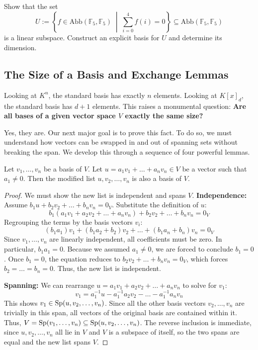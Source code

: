 \begin{exercise}
\label{exc:basis_f5_functions_subspace}
Show that the set
\[
U := \left\{ f \in \mathrm{Abb}(\mathbb{F}_5, \mathbb{F}_5) \;\middle|\; \sum_{i=0}^4 f(i) = 0 \right\} \subseteq \mathrm{Abb}(\mathbb{F}_5, \mathbb{F}_5)
\]
is a linear subspace. Construct an explicit basis for $U$ and determine its dimension.
\end{exercise}

\subsection{The Size of a Basis and Exchange Lemmas}

Looking at $K^n$, the standard basis has exactly $n$ elements. Looking at $K[x]_d$, the standard basis has $d+1$ elements. This raises a monumental question:
\textbf{Are all bases of a given vector space $V$ exactly the same size?}

Yes, they are. Our next major goal is to prove this fact. To do so, we must understand how vectors can be swapped in and out of spanning sets without breaking the span. We develop this through a sequence of four powerful lemmas.

\begin{lemma}
\label{lem:simple_exchange}
Let $v_1, \dots, v_n$ be a basis of $V$. Let $u = a_1 v_1 + \dots + a_n v_n \in V$ be a vector such that $a_1 \ne 0$. Then the modified list $u, v_2, \dots, v_n$ is also a basis of $V$.
\end{lemma}

\begin{proof}
We must show the new list is independent and spans $V$.
\textbf{Independence:} Assume $b_1 u + b_2 v_2 + \dots + b_n v_n = 0_V$. Substitute the definition of $u$:
\[
b_1 (a_1 v_1 + a_2 v_2 + \dots + a_n v_n) + b_2 v_2 + \dots + b_n v_n = 0_V
\]
Regrouping the terms by the basis vectors $v_i$:
\[
(b_1 a_1) v_1 + (b_1 a_2 + b_2) v_2 + \dots + (b_1 a_n + b_n) v_n = 0_V
\]
Since $v_1, \dots, v_n$ are linearly independent, all coefficients must be zero. In particular, $b_1 a_1 = 0$. Because we assumed $a_1 \ne 0$, we are forced to conclude $b_1 = 0$. Once $b_1 = 0$, the equation reduces to $b_2 v_2 + \dots + b_n v_n = 0_V$, which forces $b_2 = \dots = b_n = 0$. Thus, the new list is independent.

\textbf{Spanning:} We can rearrange $u = a_1 v_1 + a_2 v_2 + \dots + a_n v_n$ to solve for $v_1$:
\[
v_1 = a_1^{-1} u - a_1^{-1} a_2 v_2 - \dots - a_1^{-1} a_n v_n
\]
This shows $v_1 \in \operatorname{Sp}(u, v_2, \dots, v_n)$. Since all the other basis vectors $v_2, \dots, v_n$ are trivially in this span, all vectors of the original basis are contained within it. Thus, $V = \operatorname{Sp}(v_1, \dots, v_n) \subseteq \operatorname{Sp}(u, v_2, \dots, v_n)$. The reverse inclusion is immediate, since $u, v_2, \dots, v_n$ all lie in $V$ and $V$ is a subspace of itself, so the two spans are equal and the new list spans $V$.
\end{proof}

